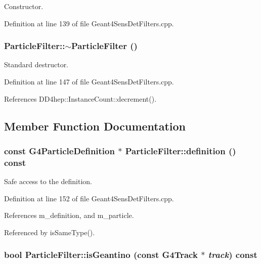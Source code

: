 Constructor. 

Definition at line 139 of file Geant4SensDetFilters.cpp.\hypertarget{struct_d_d4hep_1_1_simulation_1_1_particle_filter_a4f4ccdfa224f0a62c411230f7fb0cd65}{
\subsubsection[{$\sim$ParticleFilter}]{\setlength{\rightskip}{0pt plus 5cm}ParticleFilter::$\sim$ParticleFilter ()}}
\label{struct_d_d4hep_1_1_simulation_1_1_particle_filter_a4f4ccdfa224f0a62c411230f7fb0cd65}


Standard destructor. 

Definition at line 147 of file Geant4SensDetFilters.cpp.

References DD4hep::InstanceCount::decrement().

\subsection{Member Function Documentation}
\hypertarget{struct_d_d4hep_1_1_simulation_1_1_particle_filter_a3e4119fe7dbbca5275c231afa5d2d927}{
\subsubsection[{definition}]{\setlength{\rightskip}{0pt plus 5cm}const G4ParticleDefinition $\ast$ ParticleFilter::definition () const}}
\label{struct_d_d4hep_1_1_simulation_1_1_particle_filter_a3e4119fe7dbbca5275c231afa5d2d927}


Safe access to the definition. 

Definition at line 152 of file Geant4SensDetFilters.cpp.

References m\_\-definition, and m\_\-particle.

Referenced by isSameType().\hypertarget{struct_d_d4hep_1_1_simulation_1_1_particle_filter_a95c653ecd59f614e1a01e6f5a8986927}{
\subsubsection[{isGeantino}]{\setlength{\rightskip}{0pt plus 5cm}bool ParticleFilter::isGeantino (const G4Track $\ast$ {\em track}) const}}
\label{struct_d_d4hep_1_1_simulation_1_1_particle_filter_a95c653ecd59f614e1a01e6f5a8986927}


